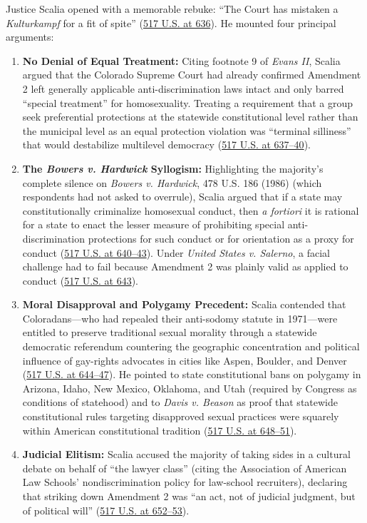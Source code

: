 \documentclass[12pt]{article}
\begin{document}
Justice Scalia opened with a memorable rebuke: ``The Court has mistaken a \textit{Kulturkampf} for a fit of spite'' (\href{https://supreme.justia.com/cases/federal/us/517/620/}{517 U.S. at 636}). He mounted four principal arguments:
\begin{enumerate}
\item \textbf{No Denial of Equal Treatment:} Citing footnote 9 of \textit{Evans II}, Scalia argued that the Colorado Supreme Court had already confirmed Amendment 2 left generally applicable anti-discrimination laws intact and only barred ``special treatment'' for homosexuality. Treating a requirement that a group seek preferential protections at the statewide constitutional level rather than the municipal level as an equal protection violation was ``terminal silliness'' that would destabilize multilevel democracy (\href{https://supreme.justia.com/cases/federal/us/517/620/}{517 U.S. at 637--40}).
\item \textbf{The \textit{Bowers v. Hardwick} Syllogism:} Highlighting the majority's complete silence on \textit{Bowers v. Hardwick}, 478 U.S. 186 (1986) (which respondents had not asked to overrule), Scalia argued that if a state may constitutionally criminalize homosexual conduct, then \textit{a fortiori} it is rational for a state to enact the lesser measure of prohibiting special anti-discrimination protections for such conduct or for orientation as a proxy for conduct (\href{https://supreme.justia.com/cases/federal/us/517/620/}{517 U.S. at 640--43}). Under \textit{United States v. Salerno}, a facial challenge had to fail because Amendment 2 was plainly valid as applied to conduct (\href{https://supreme.justia.com/cases/federal/us/517/620/}{517 U.S. at 643}).
\item \textbf{Moral Disapproval and Polygamy Precedent:} Scalia contended that Coloradans---who had repealed their anti-sodomy statute in 1971---were entitled to preserve traditional sexual morality through a statewide democratic referendum countering the geographic concentration and political influence of gay-rights advocates in cities like Aspen, Boulder, and Denver (\href{https://supreme.justia.com/cases/federal/us/517/620/}{517 U.S. at 644--47}). He pointed to state constitutional bans on polygamy in Arizona, Idaho, New Mexico, Oklahoma, and Utah (required by Congress as conditions of statehood) and to \textit{Davis v. Beason} as proof that statewide constitutional rules targeting disapproved sexual practices were squarely within American constitutional tradition (\href{https://supreme.justia.com/cases/federal/us/517/620/}{517 U.S. at 648--51}).
\item \textbf{Judicial Elitism:} Scalia accused the majority of taking sides in a cultural debate on behalf of ``the lawyer class'' (citing the Association of American Law Schools' nondiscrimination policy for law-school recruiters), declaring that striking down Amendment 2 was ``an act, not of judicial judgment, but of political will'' (\href{https://supreme.justia.com/cases/federal/us/517/620/}{517 U.S. at 652--53}).
\end{enumerate}
\end{document}
